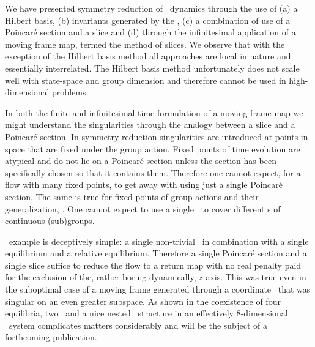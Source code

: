 
We have presented symmetry reduction of \cLe\ dynamics through the use of
(a) a Hilbert basis,  (b) invariants generated by the {\mframes},
(c) a combination of use of a Poincar\'e section and a slice and (d) through
the infinitesimal application of a moving frame map, termed the method of
slices. We observe that with the exception of the Hilbert basis method all
approaches are local in nature and essentially interrelated. The Hilbert basis
method unfortunately does not scale well with state-space and group dimension
and therefore cannot be used in high-dimensional problems.

In both the finite and infinitesimal time formulation of a moving frame map
we might understand the singularities through the analogy between a slice
and a Poincar\'e section. In symmetry reduction singularities
are introduced at points in space that are fixed under the group action.
Fixed points of time evolution are atypical and do not lie on a Poincar\'e section
unless the section has been specifically chosen so that it contains them.
Therefore one cannot expect, for a flow with many fixed points, to
get away with using just a single Poincar\'e section. The same is
true for fixed points of group actions and their generalization, \fixedsp.
One cannot expect to use a single \slice\ to cover different \fixedsp s
of continuous (sub)groups.

\CLe\ example is deceptively simple: a single non-trivial \fixedsp\ in combination
with a single equilibrium and a relative equilibrium. Therefore a single Poincar\'e
section and a single slice suffice to reduce the flow to a return map with no
real penalty paid for the exclusion of the, rather boring dynamically, $z$-axis.
This was true even in the suboptimal case of a moving frame generated through a
coordinate \csection\ that was singular on an even greater subspace.
As shown in  the
coexistence of four equilibria, two \reqva\ and a nice nested \fixedsp\
structure in an effectively $8$-dimensional \KS\ system
complicates matters considerably and will be the subject of
a forthcoming publication.
